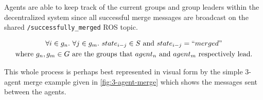 Agents are able to keep track of the current groups and group leaders within the decentralized system since all successful merge messages are broadcast on the shared \texttt{/successfully\_merged} ROS topic.

\begin{equation}
    \begin{gathered} \label{eq:state-update-equation}
        \forall i \in g_n. \ \forall j \in g_m. \ state_{i-j} \in S \text{ and } state_{i-j} = ``merged" \\ \text{where $g_n, g_m \in G$ are the groups that $agent_n$ and $agent_m$ respectively lead.}
    \end{gathered}
\end{equation}

This whole process is perhaps best represented in visual form by the simple 3-agent merge example given in \autoref{fig:3-agent-merge} which shows the messages sent between the agents.

